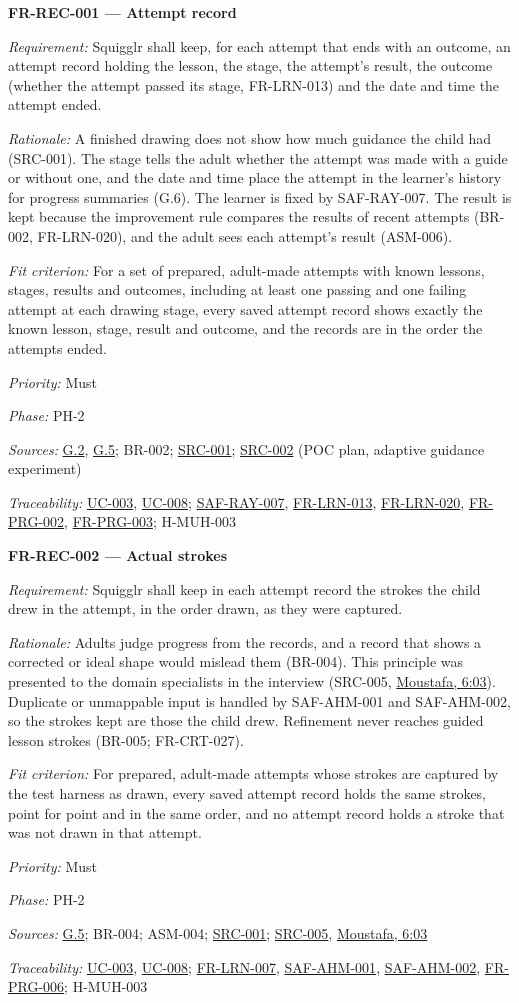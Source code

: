 \documentclass[12pt]{article}
\renewcommand{\_}{\textunderscore\allowbreak}%
\newcommand{\intlink}[3]{\hyperref[int:#1-#2]{#3}}
\newcommand{\intref}[2]{\intlink{#1}{#2}{#1, #2}}
\newcommand{\goalref}[1]{\hyperref[goal:#1]{G.#1}}
\newcommand{\ucref}[1]{\hyperref[uc:#1]{\mbox{UC-#1}}}
\newenvironment{srsrequirement}[2]{%
  \par\medskip\noindent\phantomsection\label{req:#1}%
  \textbf{#1 --- #2}\par\nobreak\smallskip }{\par\medskip}
\newcommand{\reqfield}[2]{\noindent\textit{#1:} #2\par}
\newcommand{\reqshall}[1]{\reqfield{Requirement}{#1}}
\newcommand{\reqrationale}[1]{\reqfield{Rationale}{#1}}
\newcommand{\reqfit}[1]{\reqfield{Fit criterion}{#1}}
\newcommand{\reqpriority}[1]{\reqfield{Priority}{#1}}
\newcommand{\reqphase}[1]{\reqfield{Phase}{#1}}
\newcommand{\reqsources}[1]{\reqfield{Sources}{#1}}
\newcommand{\reqtraces}[1]{\reqfield{Traceability}{#1}}
\newcommand{\reqref}[1]{\hyperref[req:#1]{#1}}
\newcommand{\srcref}[1]{\hyperref[src:#1]{SRC-#1}}
\providecommand{\ucref}[1]{\hyperref[uc:#1]{UC-#1}}
\begin{document}
\begin{srsrequirement}{FR-REC-001}{Attempt record}
  \reqshall{Squigglr shall keep, for each attempt that ends with an outcome, an
attempt record holding the lesson, the stage, the attempt's result, the outcome
(whether the attempt passed its stage, FR-LRN-013) and the date and time the
attempt ended.} \reqrationale{A finished drawing does not show how much guidance
the child had (SRC-001). The stage tells the adult whether the attempt was made
with a guide or without one, and the date and time place the attempt in the
learner's history for progress summaries (G.6). The learner is fixed by
SAF-RAY-007. The result is kept because the improvement rule compares the
results of recent attempts (BR-002, FR-LRN-020), and the adult sees each
attempt's result (ASM-006).} \reqfit{For a set of prepared, adult-made attempts
with known lessons, stages, results and outcomes, including at least one passing
and one failing attempt at each drawing stage, every saved attempt record shows
exactly the known lesson, stage, result and outcome, and the records are in the
order the attempts ended.}
  \reqpriority{Must}
  \reqphase{PH-2}
  \reqsources{\goalref{2}, \goalref{5}; BR-002; \srcref{001}; \srcref{002} (POC
plan, adaptive guidance experiment)} \reqtraces{\ucref{003}, \ucref{008};
\reqref{SAF-RAY-007}, \reqref{FR-LRN-013}, \reqref{FR-LRN-020},
\reqref{FR-PRG-002}, \reqref{FR-PRG-003}; H-MUH-003}
\end{srsrequirement}

\begin{srsrequirement}{FR-REC-002}{Actual strokes}
  \reqshall{Squigglr shall keep in each attempt record the strokes the child
drew in the attempt, in the order drawn, as they were captured.}
\reqrationale{Adults judge progress from the records, and a record that shows a
corrected or ideal shape would mislead them (BR-004). This principle was
presented to the domain specialists in the interview (SRC-005,
\intref{Moustafa}{6:03}). Duplicate or unmappable input is handled by
SAF-AHM-001 and SAF-AHM-002, so the strokes kept are those the child drew.
Refinement never reaches guided lesson strokes (BR-005; FR-CRT-027).}
\reqfit{For prepared, adult-made attempts whose strokes are captured by the test
harness as drawn, every saved attempt record holds the same strokes, point for
point and in the same order, and no attempt record holds a stroke that was not
drawn in that attempt.}
  \reqpriority{Must}
  \reqphase{PH-2}
  \reqsources{\goalref{5}; BR-004; ASM-004; \srcref{001}; \srcref{005},
\intref{Moustafa}{6:03}} \reqtraces{\ucref{003}, \ucref{008};
\reqref{FR-LRN-007}, \reqref{SAF-AHM-001}, \reqref{SAF-AHM-002},
\reqref{FR-PRG-006}; H-MUH-003}
\end{srsrequirement}
\end{document}
